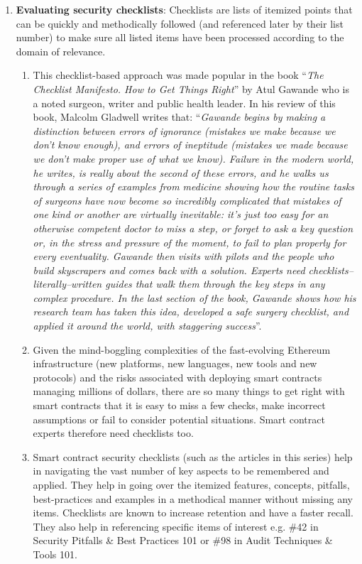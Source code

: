 \begin{enumerate}
\item\textbf{Evaluating security checklists}: Checklists are lists of itemized points that can be quickly and methodically followed (and referenced later by their list number) to make sure all listed items have been processed according to the domain of relevance.
	\begin{enumerate}
	\item This checklist-based approach was made popular in the book “\textit{The Checklist Manifesto. How to Get Things Right}” by Atul Gawande who is a noted surgeon, writer and public health leader. In his review of this book, Malcolm Gladwell writes that: “\textit{Gawande begins by making a distinction between errors of ignorance (mistakes we make because we don’t know enough), and errors of ineptitude (mistakes we made because we don’t make proper use of what we know). Failure in the modern world, he writes, is really about the second of these errors, and he walks us through a series of examples from medicine showing how the routine tasks of surgeons have now become so incredibly complicated that mistakes of one kind or another are virtually inevitable: it’s just too easy for an otherwise competent doctor to miss a step, or forget to ask a key question or, in the stress and pressure of the moment, to fail to plan properly for every eventuality. Gawande then visits with pilots and the people who build skyscrapers and comes back with a solution. Experts need checklists–literally–written guides that walk them through the key steps in any complex procedure. In the last section of the book, Gawande shows how his research team has taken this idea, developed a safe surgery checklist, and applied it around the world, with staggering success}”.
	\item Given the mind-boggling complexities of the fast-evolving Ethereum infrastructure (new platforms, new languages, new tools and new protocols) and the risks associated with deploying smart contracts managing millions of dollars, there are so many things to get right with smart contracts that it is easy to miss a few checks, make incorrect assumptions or fail to consider potential situations. Smart contract experts therefore need checklists too.
	\item Smart contract security checklists (such as the articles in this series) help in navigating the vast number of key aspects to be remembered and applied. They help in going over the itemized features, concepts, pitfalls, best-practices and examples in a methodical manner without missing any items. Checklists are known to increase retention and have a faster recall. They also help in referencing specific items of interest e.g. \#42 in Security Pitfalls \& Best Practices 101 or \#98 in Audit Techniques \& Tools 101.
	\end{enumerate}


\end{enumerate}
